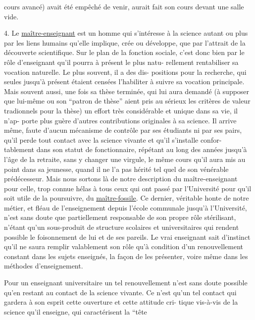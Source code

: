 
cours avancé) avait été empêché de venir, aurait fait son cours devant une
salle vide.

4.  Le \uline{maître-enseignant} est un homme qui s'intéresse à la science autant ou
plus par les liens humains qu'elle implique, crée ou développe, que par
l'attrait de la découverte scientifique. Sur le plan de la fonction sociale,
c'est donc bien par le rôle d'enseignant qu'il pourra à présent le plus natu-%
rellement rentabiliser sa vocation naturelle. Le plus souvent, il a des dis-%
positions pour la recherche, qui seules jusqu'à présent étaient censées
l'habiliter à suivre sa vocation principale. Mais souvent aussi, une fois sa
thèse terminée, qui lui aura demandé (à supposer que lui-même ou son
``patron de thèse'' aient pris au sérieux les critères de valeur tradionnels
pour la thèse) un effort très considérable et unique dans sa vie, il n'ap-%
porte plus guère d'autres contributions originales à sa science. Il arrive
même, faute d'aucun mécanisme de contrôle par ses étudiants ni par ses pairs,
qu'il perde tout contact avec la science vivante et qu'il s'installe confor-%
tablement dans son statut de fonctionnaire, répétant au long des années
jusqu'à l'âge de la retraite, sans y changer une virgule, le même cours qu'il
aura mis au point dans sa jeunesse, quand il ne l'a pas hérité tel quel
de son vénérable prédécesseur. Mais nous sortons là de notre description du
maître-enseignant pour celle, trop connue hélas à tous ceux qui ont passé
par l'Université pour qu'il soit utile de la poursuivre, du \uline{maître-fossile}.
Ce dernier, véritable honte de notre métier, et fléau de l'enseignement depuis
l'école communale jusqu'à l'Université, n'est sans doute que partiellement
responsable de son propre rôle stérilisant, n'étant qu'un sous-produit de
structure scolaires et universitaires qui rendent possible le foisonnement de
lui et de ses pareils. Le vrai enseignant sait d'instinct qu'il ne saura
remplir valablement son rôle qu'à condition d'un renouvellement constant dans
les sujets enseignés, la façon de les présenter, voire même dans les méthodes
d'enseignement.

\qquad Pour un enseignant universitaire\unsure{,|;} un tel renouvellement n'est sans
doute possible qu'en restant au contact de la science vivante. Ce n'est qu'un
tel contact qui gardera à son esprit cette ouverture et cette attitude cri-%
tique vis-à-vis de la science qu'il enseigne, qui caractérisent la ``tête

